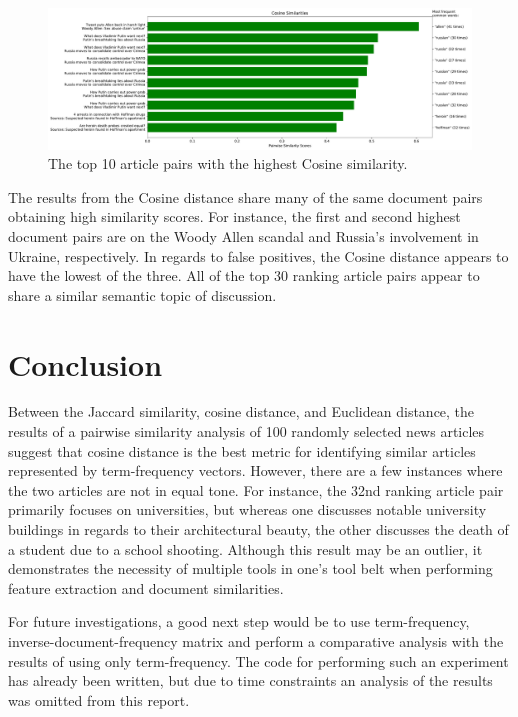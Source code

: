 \documentclass[11pt]{article}
\begin{document}
\begin{figure}[h] \label{fig:cosine}
  \centering
  \includegraphics[width=\textwidth]{figures/cosine_most_sim}
  \caption{The top 10 article pairs with the highest Cosine similarity.}
\end{figure}

The results from the Cosine distance share many of the same document pairs obtaining high similarity scores. For instance, the first and second highest document pairs are on the Woody Allen scandal and Russia's involvement in Ukraine, respectively.
In regards to false positives, the Cosine distance appears to have the lowest of the three.
All of the top 30 ranking article pairs appear to share a similar semantic topic of discussion.

\section{Conclusion}

Between the Jaccard similarity, cosine distance, and Euclidean distance, the results of a pairwise similarity analysis of 100 randomly selected news articles suggest that cosine distance is the best metric for identifying similar articles represented by term-frequency vectors.
However, there are a few instances where the two articles are not in equal tone. For instance, the 32nd ranking article pair primarily focuses on universities, but whereas one discusses notable university buildings in regards to their architectural beauty, the other discusses the death of a student due to a school shooting.
Although this result may be an outlier, it demonstrates the necessity of multiple tools in one's tool belt when performing feature extraction and document similarities.

For future investigations, a good next step would be to use term-frequency, inverse-document-frequency matrix and perform a comparative analysis with the results of using only term-frequency.
The code for performing such an experiment has already been written, but due to time constraints an analysis of the results was omitted from this report.


{}

\end{document}

